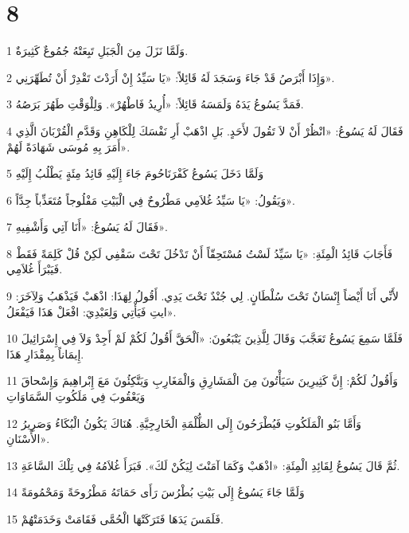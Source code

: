 \chapter{8}

\par 1 وَلَمَّا نَزَلَ مِنَ الْجَبَلِ تَبِعَتْهُ جُمُوعٌ كَثِيرَةٌ.
\par 2 وَإِذَا أَبْرَصُ قَدْ جَاءَ وَسَجَدَ لَهُ قَائِلاً: «يَا سَيِّدُ إِنْ أَرَدْتَ تَقْدِرْ أَنْ تُطَهِّرَنِي».
\par 3 فَمَدَّ يَسُوعُ يَدَهُ وَلَمَسَهُ قَائِلاً: «أُرِيدُ فَاطْهُرْ». وَلِلْوَقْتِ طَهُرَ بَرَصُهُ.
\par 4 فَقَالَ لَهُ يَسُوعُ: «انْظُرْ أَنْ لاَ تَقُولَ لأَحَدٍ. بَلِ اذْهَبْ أَرِ نَفْسَكَ لِلْكَاهِنِ وَقَدَّمِ الْقُرْبَانَ الَّذِي أَمَرَ بِهِ مُوسَى شَهَادَةً لَهُمْ».
\par 5 وَلَمَّا دَخَلَ يَسُوعُ كَفْرَنَاحُومَ جَاءَ إِلَيْهِ قَائِدُ مِئَةٍ يَطْلُبُ إِلَيْهِ
\par 6 وَيَقُولُ: «يَا سَيِّدُ غُلاَمِي مَطْرُوحٌ فِي الْبَيْتِ مَفْلُوجاً مُتَعَذِّباً جِدَّاً».
\par 7 فَقَالَ لَهُ يَسُوعُ: «أَنَا آتِي وَأَشْفِيهِ».
\par 8 فَأَجَابَ قَائِدُ الْمِئَةِ: «يَا سَيِّدُ لَسْتُ مُسْتَحِقّاً أَنْ تَدْخُلَ تَحْتَ سَقْفِي لَكِنْ قُلْ كَلِمَةً فَقَطْ فَيَبْرَأَ غُلاَمِي.
\par 9 لأَنِّي أَنَا أَيْضاً إِنْسَانٌ تَحْتَ سُلْطَانٍ. لِي جُنْدٌ تَحْتَ يَدِي. أَقُولُ لِهَذَا: اذْهَبْ فَيَذْهَبُ وَلِآخَرَ: ايتِ فَيَأْتِي وَلِعَبْدِيَ: افْعَلْ هَذَا فَيَفْعَلُ».
\par 10 فَلَمَّا سَمِعَ يَسُوعُ تَعَجَّبَ وَقَالَ لِلَّذِينَ يَتْبَعُونَ: «اَلْحَقَّ أَقُولُ لَكُمْ لَمْ أَجِدْ وَلاَ فِي إِسْرَائِيلَ إِيمَاناً بِمِقْدَارِ هَذَا.
\par 11 وَأَقُولُ لَكُمْ: إِنَّ كَثِيرِينَ سَيَأْتُونَ مِنَ الْمَشَارِقِ وَالْمَغَارِبِ وَيَتَّكِئُونَ مَعَ إِبْراهِيمَ وَإِسْحاقَ وَيَعْقُوبَ فِي مَلَكُوتِ السَّمَاوَاتِ
\par 12 وَأَمَّا بَنُو الْمَلَكُوتِ فَيُطْرَحُونَ إِلَى الظُّلْمَةِ الْخَارِجِيَّةِ. هُنَاكَ يَكُونُ الْبُكَاءُ وَصَرِيرُ الأَسْنَانِ».
\par 13 ثُمَّ قَالَ يَسُوعُ لِقَائِدِ الْمِئَةِ: «اذْهَبْ وَكَمَا آمَنْتَ لِيَكُنْ لَكَ». فَبَرَأَ غُلاَمُهُ فِي تِلْكَ السَّاعَةِ.
\par 14 وَلَمَّا جَاءَ يَسُوعُ إِلَى بَيْتِ بُطْرُسَ رَأَى حَمَاتَهُ مَطْرُوحَةً وَمَحْمُومَةً
\par 15 فَلَمَسَ يَدَهَا فَتَرَكَتْهَا الْحُمَّى فَقَامَتْ وَخَدَمَتْهُمْ.
